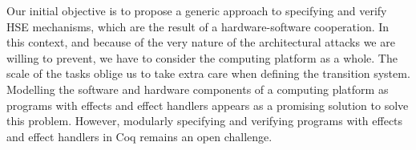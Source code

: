 Our initial objective is to propose a generic approach to specifying and verify
HSE mechanisms, which are the result of a hardware-software cooperation.
%
In this context, and because of the very nature of the architectural attacks we
are willing to prevent, we have to consider the computing platform as a whole.
%
The scale of the tasks oblige us to take extra care when defining the transition
system.
%
Modelling the software and hardware components of a computing platform as
programs with effects and effect handlers appears as a promising solution to
solve this problem.
%
However, modularly specifying and verifying programs with effects and effect
handlers in Coq remains an open challenge.

